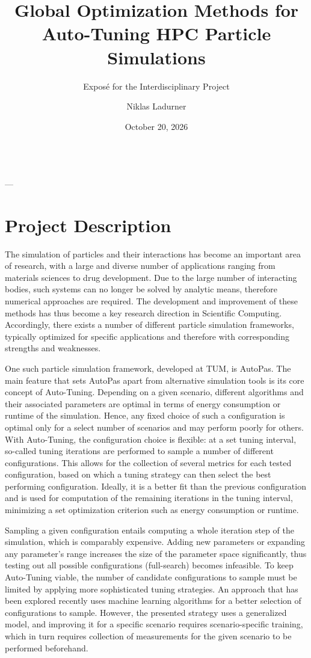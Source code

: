 \documentclass[11pt,parskip=full+]{scrartcl}
\title{Global Optimization Methods for Auto-Tuning HPC Particle Simulations}
\subtitle{Exposé for the Interdisciplinary Project}
\author{Niklas Ladurner}
\date{October 20, 2026}
\makeatletter
\renewcommand{\maketitle}{
	\begin{center}
		{\LARGE\bfseries \@title}\\[2pt]
		\large \@author{} --- \@subtitle
	\end{center}
	\let\thedate\@date
	\let\theauthor\@author
	\let\thetitle\@title
}
\makeatother
\begin{document}
\maketitle
{}
\onehalfspacing


\section*{Project Description}
\vspace*{-1em}
The simulation of particles and their interactions has become an important area of research, with a large and diverse number of applications ranging from materials sciences to drug development. Due to the large number of interacting bodies, such systems can no longer be solved by analytic means, therefore numerical approaches are required. The development and improvement of these methods has thus become a key research direction in Scientific Computing. Accordingly, there exists a number of different particle simulation frameworks, typically optimized for specific applications and therefore with corresponding strengths and weaknesses.

One such particle simulation framework, developed at TUM, is AutoPas. The main feature that sets AutoPas apart from alternative simulation tools is its core concept of Auto-Tuning. Depending on a given scenario, different algorithms and their associated parameters are optimal in terms of energy consumption or runtime of the simulation. Hence, any fixed choice of such a configuration is optimal only for a select number of scenarios and may perform poorly for others. With Auto-Tuning, the configuration choice is flexible: at a set tuning interval, so-called tuning iterations are performed to sample a number of different configurations. This allows for the collection of several metrics for each tested configuration, based on which a tuning strategy can then select the best performing configuration. Ideally, it is a better fit than the previous configuration and is used for computation of the remaining iterations in the tuning interval, minimizing a set optimization criterion such as energy consumption or runtime. \cite{Newcome2025,Gratl2019,Seckler2021,Gratl2021}

Sampling a given configuration entails computing a whole iteration step of the simulation, which is comparably expensive. Adding new parameters or expanding any parameter's range increases the size of the parameter space significantly, thus testing out all possible configurations (full-search) becomes infeasible. To keep Auto-Tuning viable, the number of candidate configurations to sample must be limited by applying more sophisticated tuning strategies. An approach that has been explored recently uses machine learning algorithms for a better selection of configurations to sample. However, the presented strategy uses a generalized model, and improving it for a specific scenario requires scenario-specific training, which in turn requires collection of measurements for the given scenario to be performed beforehand. \cite{Metscher2025}
\end{document}
